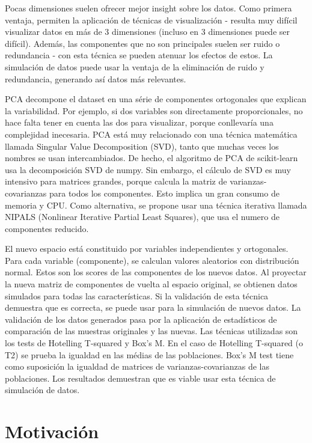 \documentclass[11pt,spanish,listoffigures,listoftables]{tfgetsinf}
\begin{document}
Pocas dimensiones suelen ofrecer mejor insight sobre los datos. Como primera ventaja, permiten la aplicación de técnicas de visualización - resulta muy difícil visualizar datos en más de 3 dimensiones (incluso en 3 dimensiones puede ser difícil). Además, las componentes que no son principales suelen ser ruido o redundancia - con esta técnica se pueden atenuar los efectos de estos. La simulación de datos puede usar la ventaja de la eliminación de ruido y redundancia, generando así datos más relevantes.

PCA decompone el dataset en una série de componentes ortogonales que explican la variabilidad. Por ejemplo, si dos variables son directamente proporcionales, no hace falta tener en cuenta las dos para visualizar, porque conllevaría una complejidad inecesaria. PCA está muy relacionado con una técnica matemática llamada Singular Value Decomposition (SVD), tanto que muchas veces los nombres se usan intercambiados. De hecho, el algoritmo de PCA de scikit-learn usa la decomposición SVD de numpy. Sin embargo, el cálculo de SVD es muy intensivo para matrices grandes, porque calcula la matriz de varianzas-covarianzas para todos los componentes. Esto implica un gran consumo de memoria y CPU. Como alternativa, se propone usar una técnica iterativa llamada NIPALS (Nonlinear Iterative Partial Least Squares), que usa el numero de componentes reducido.

El nuevo espacio está constituido por variables independientes y ortogonales. Para cada variable (componente), se calculan valores aleatorios con distribución normal. Estos son los scores de las componentes de los nuevos datos. Al proyectar la nueva matriz de componentes de vuelta al espacio original, se obtienen datos simulados para todas las características. Si la validación de esta técnica demuestra que es correcta, se puede usar para la simulación de nuevos datos. La validación de los datos generados pasa por la aplicación de estadísticos de comparación de las muestras originales y las nuevas. Las técnicas utilizadas son los tests de Hotelling T-squared y Box's M. En el caso de Hotelling T-squared (o T2) se prueba la igualdad en las médias de las poblaciones. Box's M test tiene como suposición la igualdad de matrices de varianzas-covarianzas de las poblaciones. Los resultados demuestran que es viable usar esta técnica de simulación de datos.

\section{Motivaci\'on}
\end{document}
